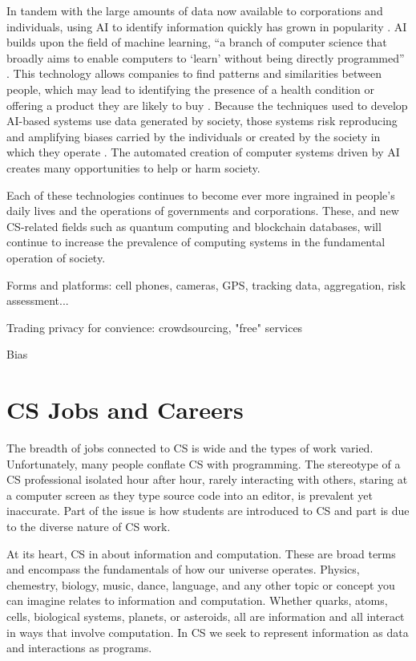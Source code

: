 In tandem with the large amounts of data now available to corporations and individuals, using AI to identify information quickly has grown in popularity \parencite{vinichenko_threats_2021}. AI builds upon the field of machine learning, “a branch of computer science that broadly aims to enable computers to ‘learn’ without being directly programmed” \parencite[p. 2222]{bi_what_2019}. This technology allows companies to find patterns and similarities between people, which may lead to identifying the presence of a health condition or offering a product they are likely to buy \parencite{fennelly_for_2021, ma_machine_2020}. Because the techniques used to develop AI-based systems use data generated by society, those systems risk reproducing and amplifying biases carried by the individuals or created by the society in which they operate \parencite{wiens_diagnosing_2020}. The automated creation of computer systems driven by AI creates many opportunities to help or harm society.

Each of these technologies continues to become ever more ingrained in people's daily lives and the operations of governments and corporations. These, and new CS-related fields such as quantum computing and blockchain databases, will continue to increase the prevalence of computing systems in the fundamental operation of society.



Forms and platforms: cell phones, cameras, GPS, tracking data, aggregation, risk assessment... 

Trading privacy for convience: crowdsourcing, "free" services

Bias


\section{CS Jobs and Careers}

The breadth of jobs connected to CS is wide and the types of work varied. Unfortunately, many people conflate CS with programming. The stereotype of a CS professional isolated hour after hour, rarely interacting with others, staring at a computer screen as they type source code into an editor, is prevalent yet inaccurate. Part of the issue is how students are introduced to CS and part is due to the diverse nature of CS work.

At its heart, CS in about information and computation. These are broad terms and encompass the fundamentals of how our universe operates. Physics, chemestry, biology, music, dance, language, and any other topic or concept you can imagine relates to information and computation. Whether quarks, atoms, cells, biological systems, planets, or asteroids, all are information and all interact in ways that involve computation. In CS we seek to represent information as data and interactions as programs.

